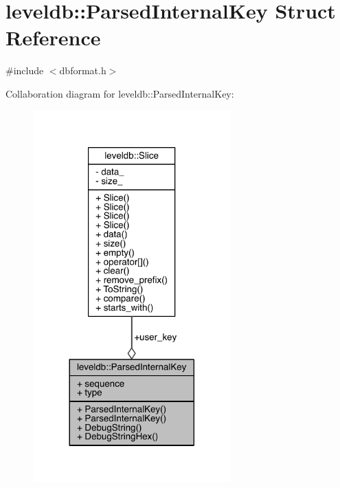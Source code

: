 \hypertarget{structleveldb_1_1_parsed_internal_key}{}\section{leveldb\+:\+:Parsed\+Internal\+Key Struct Reference}
\label{structleveldb_1_1_parsed_internal_key}


{\ttfamily \#include $<$dbformat.\+h$>$}



Collaboration diagram for leveldb\+:\+:Parsed\+Internal\+Key\+:\nopagebreak
\begin{figure}[H]
\begin{center}
\leavevmode
\includegraphics[width=216pt]{structleveldb_1_1_parsed_internal_key__coll__graph}
\end{center}
\end{figure}
